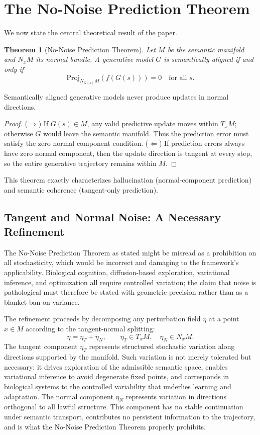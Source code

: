 \documentclass[11pt,a4paper,twocolumn]{article}
\newtheorem{theorem}{Theorem}[section]
\begin{document}
\section{The No-Noise Prediction Theorem}

We now state the central theoretical result of the paper.

\begin{theorem}[No-Noise Prediction Theorem]
Let $M$ be the semantic manifold and $N_x M$ its normal bundle.
A generative model $G$ is semantically aligned if and only if
\[
\mathrm{Proj}_{N_{G(s)} M}(f(G(s))) = 0
\quad
\text{for all $s$.}
\]
\end{theorem}

\noindent Semantically aligned generative models never produce updates
in normal directions.

\begin{proof}
($\Rightarrow$) If $G(s) \in M$, any valid predictive update moves
within $T_x M$; otherwise $G$ would leave the semantic manifold. Thus
the prediction error must satisfy the zero normal component condition.
($\Leftarrow$) If prediction errors always have zero normal component,
then the update direction is tangent at every step, so the entire
generative trajectory remains within $M$.
\end{proof}

This theorem exactly characterizes hallucination (normal-component
prediction) and semantic coherence (tangent-only prediction).

\subsection{Tangent and Normal Noise: A Necessary Refinement}

The No-Noise Prediction Theorem as stated might be misread as
a prohibition on all stochasticity, which would be incorrect and
damaging to the framework's applicability. Biological cognition,
diffusion-based exploration, variational inference, and
optimization all require controlled variation; the claim that
noise is pathological must therefore be stated with geometric
precision rather than as a blanket ban on variance.

The refinement proceeds by decomposing any perturbation field
$\eta$ at a point $x \in M$ according to the tangent-normal
splitting:
\[
\eta = \eta_T + \eta_N,
\qquad
\eta_T \in T_x M,
\quad
\eta_N \in N_x M.
\]
The tangent component $\eta_T$ represents structured stochastic
variation along directions supported by the manifold. Such
variation is not merely tolerated but necessary: it drives
exploration of the admissible semantic space, enables
variational inference to avoid degenerate fixed points, and
corresponds in biological systems to the controlled variability
that underlies learning and adaptation. The normal component
$\eta_N$ represents variation in directions orthogonal to all
lawful structure. This component has no stable continuation
under semantic transport, contributes no persistent information
to the trajectory, and is what the No-Noise Prediction Theorem
properly prohibits.
\end{document}
